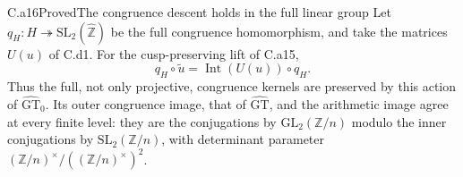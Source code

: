 \begin{claim}{C.a16}{Proved}{The congruence descent holds in the full linear group}
Let $q_H:H\twoheadrightarrow\mathrm{SL}_2(\widehat{\mathbb Z})$ be
the full congruence homomorphism, and take the matrices $U(u)$ of C.d1.
For the cusp-preserving lift of C.a15,
\[
 q_H\circ\widetilde u=\operatorname{Int}(U(u))\circ q_H.
 \tag{C.a16.1}
\]
Thus the full, not only projective, congruence kernels are preserved by
this action of $\widehat{\mathrm{GT}}_0$. Its outer congruence image,
that of $\widehat{\mathrm{GT}}$, and the arithmetic image agree at
every finite level: they are the conjugations by
$\mathrm{GL}_2(\mathbb Z/n)$ modulo the inner conjugations by
$\mathrm{SL}_2(\mathbb Z/n)$, with determinant parameter
$(\mathbb Z/n)^{\times}/((\mathbb Z/n)^{\times})^2$.
\end{claim}

